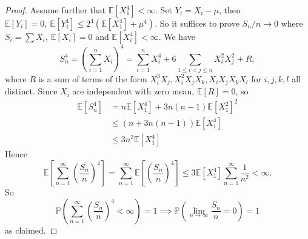 \begin{proof}
    Assume further that $ \mathbb{E}[X_1^4]<\infty $. Set $ Y_i=X_i-\mu $, then $ \mathbb{E}[Y_i]=0,\ \mathbb{E}[Y_1^4]\le 2^4(\mathbb{E}[X_1^4]+\mu^4) $. So it suffices to prove $ S_n/n\to 0 $ where $ S_i=\sum X_i,\ \mathbb{E}[X_i]=0 $ and $ \mathbb{E}[X_i^4]<\infty  $. We have 
    \[
        S_n^4=\left( \sum_{i=1}^nX_i \right)^4=\sum_{i=1}^nX_i^4+6\sum_{1\le i<j\le n}X_i^2X_j^2+R,
    \]
    where $R$ is a sum of terms of the form $X_i^3X_j,X_i^2X_jX_k,X_iX_jX_kX_l$ for $i,j,k,l$ all distinct. Since $X_i$ are independent with zero mean, $\mathbb E[R]=0$, so
    \begin{align*}
        \mathbb E[S_n^4]&=n\mathbb E[X_1^4]+3n(n-1)\mathbb E[X_1^2]^2\\
        &\le (n+3n(n-1))\mathbb E[X_1^4]\\
        &\le 3n^2\mathbb E[X_1^4]
    \end{align*}
    Hence
    $$\mathbb E\left[ \sum_{n=1}^\infty\left( \frac{S_n}{n} \right)^4 \right]=\sum_{n=1}^\infty\mathbb E\left[ \left( \frac{S_n}{n} \right)^4 \right]\le 3\mathbb E[X_1^4]\sum_{n=1}^\infty\frac{1}{n^2}<\infty.$$
    So
    $$\mathbb P\left(\sum_{n=1}^\infty\left( \frac{S_n}{n} \right)^4<\infty\right)=1\implies\mathbb P\left(\lim_{n\to\infty}\frac{S_n}{n}=0\right)=1$$
    as claimed.
\end{proof}
